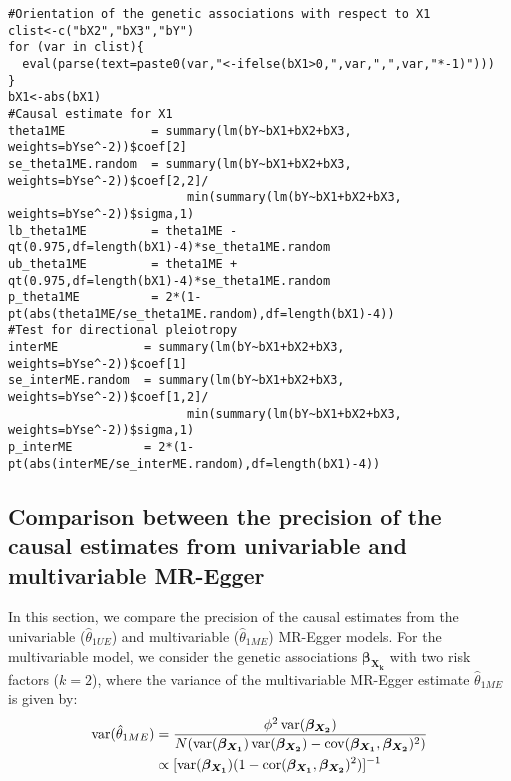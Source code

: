 \documentclass[a4paper,12pt]{article}
\DeclareMathOperator{\cor}{cor}
\DeclareMathOperator{\cov}{cov}
\DeclareMathOperator{\var}{var}
\begin{document}
{\scriptsize{
\begin{verbatim}
#Orientation of the genetic associations with respect to X1
clist<-c("bX2","bX3","bY")
for (var in clist){
  eval(parse(text=paste0(var,"<-ifelse(bX1>0,",var,",",var,"*-1)")))
}
bX1<-abs(bX1)
#Causal estimate for X1
theta1ME            = summary(lm(bY~bX1+bX2+bX3, weights=bYse^-2))$coef[2]
se_theta1ME.random  = summary(lm(bY~bX1+bX2+bX3, weights=bYse^-2))$coef[2,2]/
                         min(summary(lm(bY~bX1+bX2+bX3, weights=bYse^-2))$sigma,1)
lb_theta1ME         = theta1ME - qt(0.975,df=length(bX1)-4)*se_theta1ME.random
ub_theta1ME         = theta1ME + qt(0.975,df=length(bX1)-4)*se_theta1ME.random
p_theta1ME          = 2*(1-pt(abs(theta1ME/se_theta1ME.random),df=length(bX1)-4))
#Test for directional pleiotropy
interME            = summary(lm(bY~bX1+bX2+bX3, weights=bYse^-2))$coef[1]
se_interME.random  = summary(lm(bY~bX1+bX2+bX3, weights=bYse^-2))$coef[1,2]/
                         min(summary(lm(bY~bX1+bX2+bX3, weights=bYse^-2))$sigma,1)
p_interME          = 2*(1-pt(abs(interME/se_interME.random),df=length(bX1)-4))
\end{verbatim}
}

\clearpage
\begin{bibunit}[wileyj]
\section{Comparison between the precision of the causal estimates from univariable and multivariable MR-Egger}
\normalsize{In this section, we compare the precision of the causal estimates from the univariable ($\hat{\theta}_{1UE}$) and multivariable ($\hat{\theta}_{1ME}$) MR-Egger models. For the multivariable model, we consider the genetic associations $\boldsymbol{\beta_{X_{k}}}$ with two risk factors ($k=2$), where the variance of the multivariable MR-Egger estimate $\hat{\theta}_{1ME}$ is given by:
\begin{align}
\var(\hat{\theta}_{1ME}) &= \frac{\phi^2\var(\boldsymbol{\beta_{X_{2}}})}{N(\var(\boldsymbol{\beta_{X_{1}}})\var(\boldsymbol{\beta_{X_{2}}})-\cov(\boldsymbol{\beta_{X_{1}}},\boldsymbol{\beta_{X_{2}}})^{2})} \notag \\
&\propto [\var(\boldsymbol{\beta_{X_{1}}})(1-\cor(\boldsymbol{\beta_{X_{1}}},\boldsymbol{\beta_{X_{2}}})^{2})]^{-1}
\end{align}

}
\end{bibunit}}
\end{document}
